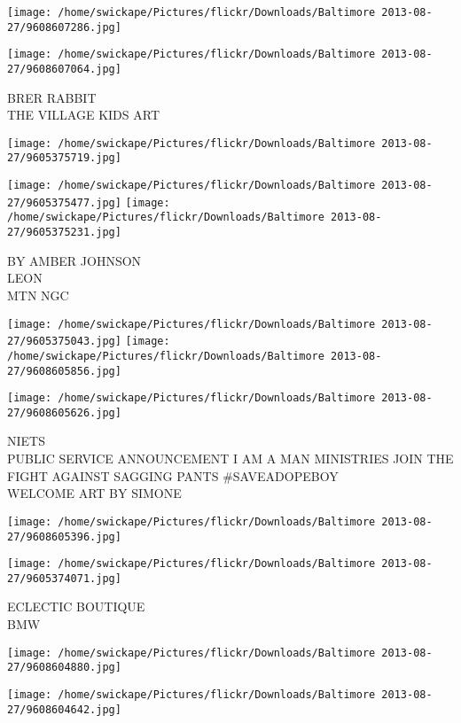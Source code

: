 \documentclass[10pt,letterpaper]{article}
\begin{document}
\texttt{[image: /home/swickape/Pictures/flickr/Downloads/Baltimore 2013-08-27/9608607286.jpg]}

\vspace{0.25in}
\texttt{[image: /home/swickape/Pictures/flickr/Downloads/Baltimore 2013-08-27/9608607064.jpg]}

BRER RABBIT\\
THE VILLAGE KIDS ART
\pagebreak

\texttt{[image: /home/swickape/Pictures/flickr/Downloads/Baltimore 2013-08-27/9605375719.jpg]}

\vspace{0.25in}
\texttt{[image: /home/swickape/Pictures/flickr/Downloads/Baltimore 2013-08-27/9605375477.jpg]}
\texttt{[image: /home/swickape/Pictures/flickr/Downloads/Baltimore 2013-08-27/9605375231.jpg]}

BY AMBER JOHNSON\\
LEON\\
MTN NGC
\pagebreak

\texttt{[image: /home/swickape/Pictures/flickr/Downloads/Baltimore 2013-08-27/9605375043.jpg]}
\texttt{[image: /home/swickape/Pictures/flickr/Downloads/Baltimore 2013-08-27/9608605856.jpg]}

\texttt{[image: /home/swickape/Pictures/flickr/Downloads/Baltimore 2013-08-27/9608605626.jpg]}

NIETS\\
PUBLIC SERVICE ANNOUNCEMENT I AM A MAN MINISTRIES JOIN THE FIGHT AGAINST SAGGING PANTS \#SAVEADOPEBOY\\
WELCOME ART BY SIMONE
\pagebreak

\texttt{[image: /home/swickape/Pictures/flickr/Downloads/Baltimore 2013-08-27/9608605396.jpg]}

\vspace{0.25in}
\texttt{[image: /home/swickape/Pictures/flickr/Downloads/Baltimore 2013-08-27/9605374071.jpg]}

ECLECTIC BOUTIQUE\\
BMW
\pagebreak

\texttt{[image: /home/swickape/Pictures/flickr/Downloads/Baltimore 2013-08-27/9608604880.jpg]}

\vspace{0.25in}
\texttt{[image: /home/swickape/Pictures/flickr/Downloads/Baltimore 2013-08-27/9608604642.jpg]}
\end{document}

